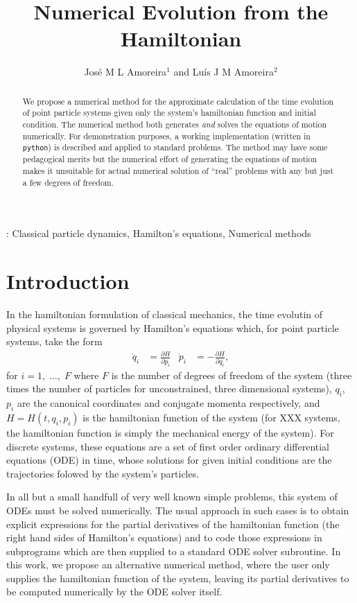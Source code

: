 \documentclass{iopart}
\newcommand{\pd}[2]{\frac{\partial#1}{\partial#2}}
\begin{document}
\title{Numerical Evolution from the Hamiltonian}
\author{José M L Amoreira$^1$ and Luís J M Amoreira$^2$}
\address{$^1$ Departamento de Física, Instituto Superior Técnico, Lisboa,
Portugal}
\address{$^2$ Departamento de Física, Universidade da Beira Interior, Covilhã,
Portugal}
\begin{abstract}
  We propose a numerical method for the approximate calculation of the time
  evolution of point particle systems given only the system's hamiltonian
  function and initial condition. The numerical method both generates \emph{and}
  solves the equations of motion numerically. For demonstration purposes, a
  working im\-ple\-men\-ta\-tion (written in \texttt{python}) is described and
  applied to standard problems. The method may have some pedagogical merits but
  the numerical effort of generating the equations of motion makes it unsuitable
  for actual numerical solution of ``real'' problems with any but just a few
  degrees of freedom.
\end{abstract}
: Classical particle dynamics,
Hamilton's equations,
Numerical methods

\submitto{\EJP}
\section{Introduction}
In the hamiltonian formulation of classical mechanics, the time evolutin of
physical systems is governed by Hamilton's equations which, for point particle
systems, take the form
\begin{align}
  \dot q_i&=\pd{H}{p_i}&
  \dot p_i&=-\pd{H}{q_i},
\end{align}
for $i=1,\;\ldots,\;F$ where $F$ is the number of degrees of freedom of the
system (three times the number of particles for unconstrained, three dimensional
systems), $q_i$, $p_i$ are the canonical coordinates and conjugate momenta
respectively, and $H=H(t, q_i, p_i)$ is the hamiltonian function of the system
(for XXX systems, the hamiltonian function is simply the mechanical energy of
the system). For discrete systems, these equations are a set of first order
ordinary differential equations (ODE) in time, whose solutions for given initial
conditions are the trajectories folowed by the system's particles.

In all but a small handfull of very well known simple problems, this system of
ODEs must be solved numerically. The usual approach in such cases is to obtain
explicit expressions for the partial derivatives of the hamiltonian function
(the right hand sides of Hamilton's equations) and to code those expressions in
subprograms which are then supplied to a standard ODE solver subroutine. In this
work, we propose an alternative numerical method, where the user only supplies
the hamiltonian function of the system, leaving its partial derivatives to be
computed numerically by the ODE solver itself.
\end{document}
